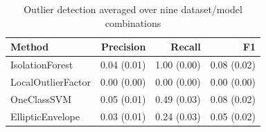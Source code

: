 \begin{table}[htbp]
\centering
\begin{tabular}{lrrr}
\toprule
Method & Precision & Recall & F1 \\
\midrule
IsolationForest & 0.04 (0.01) & 1.00 (0.00) & 0.08 (0.02) \\
LocalOutlierFactor & 0.00 (0.00) & 0.00 (0.00) & 0.00 (0.00) \\
OneClassSVM & 0.05 (0.01) & 0.49 (0.03) & 0.08 (0.02) \\
EllipticEnvelope & 0.03 (0.01) & 0.24 (0.03) & 0.05 (0.02) \\
\bottomrule
\end{tabular}
\caption{Outlier detection averaged over nine dataset/model combinations}
\label{tab:table1}
\end{table}
